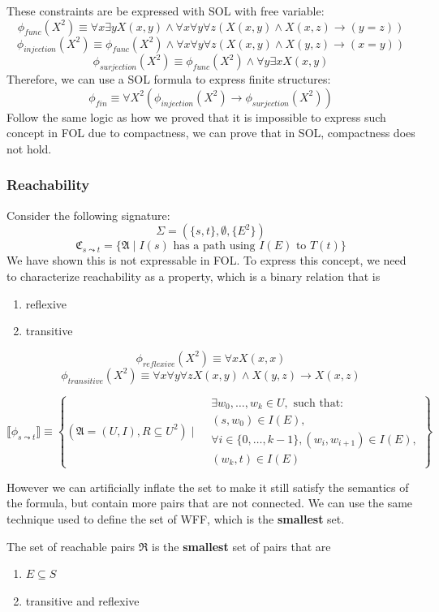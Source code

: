\documentclass{article}
\newtheorem{definition}[theorem]{Definition}
\let\olddefinition\definition
\let\endolddefinition\enddefinition
\renewenvironment{definition}
  {\begin{tcolorbox}[
      colback=red!10,
      colframe=red!50!black,
      boxrule=0.6pt,
      arc=2pt,
      left=6pt,right=6pt,top=4pt,bottom=4pt,
      breakable
    ]\olddefinition}
  {\endolddefinition\end{tcolorbox}}
\begin{document}
These constraints are be expressed with SOL with free variable: 
\[\phi_{func}(X^2) \equiv \forall x\exists y X(x, y) \land \forall x\forall y \forall z (X(x, y)\land X(x, z) \rightarrow (y = z))\]
\[\phi_{injection}(X^2) \equiv \phi_{func}(X^2) \land \forall x \forall y \forall z(X(x, y) \land X(y, z) \rightarrow (x = y))\]
\[\phi_{surjection}(X^2) \equiv \phi_{func}(X^2) \land \forall y \exists x X(x, y)\]
Therefore, we can use a SOL formula to express finite structures: 
\[\phi_{fin} \equiv \forall X^2 (\phi_{injection}(X^2) \rightarrow \phi_{surjection}(X^2))\]
Follow the same logic as how we proved that it is impossible to express such concept in FOL due to compactness, we can prove that in SOL, compactness does not hold. 

\subsubsection{Reachability}
Consider the following signature: 
\[\Sigma = (\{s, t\}, \emptyset, \{E^2\})\]
\[\mathfrak{C}_{s\leadsto t} = \{\mathfrak{A} \mid I(s) \text{ has a path using } I(E) \text{ to } T(t)\}\]
We have shown this is not expressable in FOL. To express this concept, we need to characterize reachability as a property, which is 
a binary relation that is 
\begin{enumerate}
    \item reflexive
    \item transitive
\end{enumerate}

\[\phi_{reflexive}(X^2) \equiv \forall x X(x, x)\]
\[\phi_{transitive}(X^2) \equiv \forall x\forall y \forall z X(x, y) \land X(y, z) \rightarrow X(x, z)\]

$$\llbracket \phi_{s\leadsto t} \rrbracket \equiv \left\{ (\mathfrak{A} = (U, I), R \subseteq U^2) \mid 
\begin{aligned}
    &\exists w_0, \dots, w_k \in U, \text{ such that:} \\
    &(s, w_0) \in I(E), \\
    &\forall i \in \{0, \dots, k-1\}, (w_i, w_{i+1}) \in I(E), \\
    &(w_k, t) \in I(E)
\end{aligned}
\right\}$$

However we can artificially inflate the set to make it still satisfy the semantics of the formula, but contain more 
pairs that are not connected. We can use the same technique used to define the set of WFF, which is the \textbf{smallest} set.
\begin{definition}
    The set of reachable pairs $\mathfrak{R}$ is the \textbf{smallest} set of pairs that are 
    \begin{enumerate}
        \item $E \subseteq S$
        \item transitive and reflexive
    \end{enumerate}
\end{definition}
\end{document}
